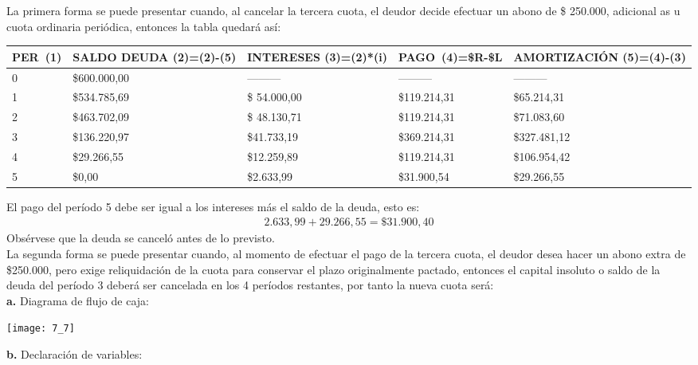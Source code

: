 La primera forma se puede presentar cuando, al cancelar la tercera cuota, el deudor decide efectuar un abono de \$ 250.000, adicional as u cuota ordinaria periódica, entonces la tabla quedará así:
\begin{spacing}{1.1}
    \begin{center}
        \begin{tabular}{|p{1cm}|p{2cm}|p{2cm}|p{2cm}|p{3cm}|}
        \hline 
        \rowcolor{white!50}
            \textbf{PER\ (1)} & \textbf{SALDO DEUDA (2)=(2)-(5)} & \textbf{INTERESES  (3)=(2)*(i)}& \textbf{PAGO\ (4)=\$R-\$L }& \textbf{AMORTIZACIÓN  (5)=(4)-(3)} \\ \hline                        

            0 & \$600.000,00 & --------- & --------- & ---------\\ \hline 
            1 & \$534.785,69  &\$ 54.000,00  & \$119.214,31  & \$65.214,31 \\ \hline
            2 & \$463.702,09  &\$ 48.130,71  & \$119.214,31  & \$71.083,60 \\ \hline
            3 & \$136.220,97 & \$41.733,19  & \$369.214,31 & \$327.481,12 \\ \hline
            4 & \$29.266,55  & \$12.259,89  & \$119.214,31  & \$106.954,42 \\ \hline
            5 & \$0,00  & \$2.633,99  & \$31.900,54  & \$29.266,55 \\ \hline

 
\end{tabular}
\end{center}
\end{spacing}


El pago del período 5 debe ser igual a los intereses más el saldo de la deuda, esto es:
\begin{align*}
	2.633,99+29.266,55=\$31.900,40
\end{align*}
Obsérvese que la deuda se canceló antes de lo previsto.\\

La segunda forma se puede presentar cuando, al momento de efectuar el pago de la tercera cuota, el deudor desea hacer un abono extra de \$250.000, pero exige reliquidación de la cuota para conservar el plazo originalmente pactado, entonces el capital insoluto o saldo de la deuda del período 3 deberá ser cancelada en los 4 períodos restantes, por tanto la nueva cuota será:\\

\textbf{a.} Diagrama de flujo de caja:
\begin{center}
	\texttt{[image: 7\_7]}
\end{center}
\textbf{b.}	Declaración de variables: \\


